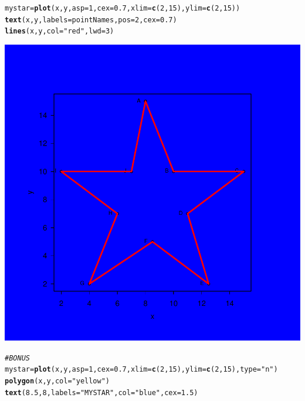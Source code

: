 \documentclass{article}\usepackage[]{graphicx}\usepackage[]{xcolor}
\makeatletter
\newcommand{\hlnum}[1]{\textcolor[rgb]{0.686,0.059,0.569}{#1}}%
\newcommand{\hlstr}[1]{\textcolor[rgb]{0.192,0.494,0.8}{#1}}%
\newcommand{\hlcom}[1]{\textcolor[rgb]{0.678,0.584,0.686}{\textit{#1}}}%
\newcommand{\hlstd}[1]{\textcolor[rgb]{0.345,0.345,0.345}{#1}}%
\newcommand{\hlkwb}[1]{\textcolor[rgb]{0.69,0.353,0.396}{#1}}%
\newcommand{\hlkwc}[1]{\textcolor[rgb]{0.333,0.667,0.333}{#1}}%
\newcommand{\hlkwd}[1]{\textcolor[rgb]{0.737,0.353,0.396}{\textbf{#1}}}%
\newenvironment{kframe}{%
 \def\at@end@of@kframe{}%
 \ifinner\ifhmode%
  \def\at@end@of@kframe{\end{minipage}}%
  \begin{minipage}{\columnwidth}%
 \fi\fi%
 \def\FrameCommand##1{\hskip\@totalleftmargin \hskip-\fboxsep
 \colorbox{shadecolor}{##1}\hskip-\fboxsep
     \hskip-\linewidth \hskip-\@totalleftmargin \hskip\columnwidth}%
 \MakeFramed {\advance\hsize-\width
   \@totalleftmargin\z@ \linewidth\hsize
   \@setminipage}}%
 {\par\unskip\endMakeFramed%
 \at@end@of@kframe}
\newenvironment{knitrout}{}{} %
\makeatother
\begin{document}
\begin{knitrout}
\begin{kframe}
\begin{alltt}
\hlstd{mystar} \hlkwb{=} \hlkwd{plot}\hlstd{(x,y,} \hlkwc{asp} \hlstd{=} \hlnum{1}\hlstd{,} \hlkwc{cex} \hlstd{=} \hlnum{0.7}\hlstd{,} \hlkwc{xlim} \hlstd{=}\hlkwd{c}\hlstd{(}\hlnum{2}\hlstd{,}\hlnum{15}\hlstd{),} \hlkwc{ylim} \hlstd{=} \hlkwd{c}\hlstd{(}\hlnum{2}\hlstd{,}\hlnum{15}\hlstd{))}
\hlkwd{text}\hlstd{(x,y,}\hlkwc{labels} \hlstd{= pointNames,}\hlkwc{pos}\hlstd{=}\hlnum{2}\hlstd{,}\hlkwc{cex} \hlstd{=} \hlnum{0.7}\hlstd{)}
\hlkwd{lines}\hlstd{(x,y,} \hlkwc{col} \hlstd{=} \hlstr{"red"}\hlstd{,}\hlkwc{lwd} \hlstd{=} \hlnum{3}\hlstd{)}
\end{alltt}
\end{kframe}

{\centering \includegraphics[width=.6\linewidth]{figure/Meng51940633A4-Rnwauto-report-8} 

}


\begin{kframe}\begin{alltt}
\hlcom{#BONUS}
\hlstd{mystar} \hlkwb{=} \hlkwd{plot}\hlstd{(x,y,} \hlkwc{asp} \hlstd{=} \hlnum{1}\hlstd{,} \hlkwc{cex} \hlstd{=} \hlnum{0.7}\hlstd{,} \hlkwc{xlim} \hlstd{=}\hlkwd{c}\hlstd{(}\hlnum{2}\hlstd{,}\hlnum{15}\hlstd{),} \hlkwc{ylim} \hlstd{=} \hlkwd{c}\hlstd{(}\hlnum{2}\hlstd{,}\hlnum{15}\hlstd{),} \hlkwc{type}\hlstd{=}\hlstr{"n"}\hlstd{)}
\hlkwd{polygon}\hlstd{(x,y,}\hlkwc{col}\hlstd{=}\hlstr{"yellow"}\hlstd{)}
\hlkwd{text}\hlstd{(}\hlnum{8.5}\hlstd{,}\hlnum{8}\hlstd{,}\hlkwc{labels} \hlstd{=} \hlstr{"MY STAR"}\hlstd{,} \hlkwc{col}\hlstd{=} \hlstr{"blue"}\hlstd{,} \hlkwc{cex} \hlstd{=} \hlnum{1.5}\hlstd{)}
\end{alltt}
\end{kframe}


\end{knitrout}
\end{document}
